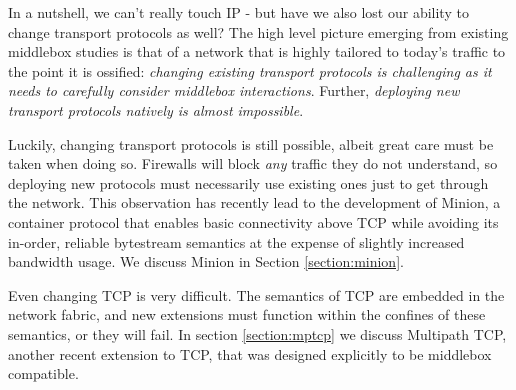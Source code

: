 In a nutshell, we can't really touch IP - but have we also lost our ability to change transport protocols as well? 
The high level picture emerging from existing middlebox studies is that of a network that is highly tailored to today's traffic
to the point it is ossified: \emph{changing existing transport protocols is challenging as it needs to carefully consider
middlebox interactions}. Further, \emph{deploying new transport protocols natively is almost impossible}. 

Luckily, changing transport protocols is still possible, albeit great care must be taken when doing so. 
Firewalls will block \emph{any} traffic they do not understand, so deploying new protocols
must necessarily use existing ones just to get through the network. This observation has recently lead to the development
of Minion, a container protocol that enables basic connectivity above TCP while avoiding its in-order, reliable bytestream
semantics at the expense of slightly increased bandwidth usage. We discuss Minion in Section \ref{section:minion}.

Even changing TCP is very difficult. The semantics of TCP are embedded in the network fabric, and new extensions
must function within the confines of these semantics, or they will fail. In section \ref{section:mptcp} we discuss Multipath TCP, 
another recent extension to TCP, that was designed explicitly to be middlebox compatible.  

